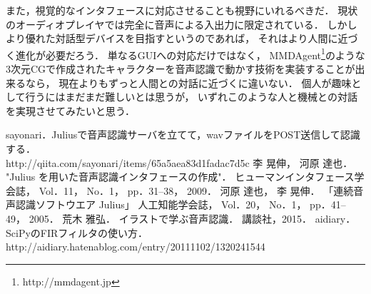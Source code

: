 \documentclass{jsarticle}
\begin{document}
\begin{multicols}{2}
また，視覚的なインタフェースに対応させることも視野にいれるべきだ．
現状のオーディオプレイヤでは完全に音声による入出力に限定されている．
しかしより優れた対話型デバイスを目指すというのであれば，
それはより人間に近づく進化が必要だろう．
単なるGUIへの対応だけではなく，
MMDAgent\footnote{http://mmdagent.jp}のような3次元CGで作成されたキャラクターを音声認識で動かす技術を実装することが出来るなら，
現在よりもずっと人間との対話に近づくに違いない．
個人が趣味として行うにはまだまだ難しいとは思うが，
いずれこのような人と機械との対話を実現させてみたいと思う．

\begin{thebibliography}{9}
	sayonari．Juliusで音声認識サーバを立てて，wavファイルをPOST送信して認識する．\\
	http://qiita.com/sayonari/items/65a5aea83d1fadac7d5c
	李 晃伸， 河原 達也．
	"Julius を用いた音声認識インタフェースの作成"．
	ヒューマンインタフェース学会誌， Vol．11， No．1， pp．31--38， 2009．
	河原 達也， 李 晃伸．
	「連続音声認識ソフトウエア Julius」
	人工知能学会誌， Vol．20， No．1， pp．41--49， 2005．
	荒木 雅弘．
	イラストで学ぶ音声認識．
	講談社，2015．
	aidiary．
	SciPyのFIRフィルタの使い方． \\
	http://aidiary.hatenablog.com/entry/20111102/1320241544
\end{thebibliography}


\end{multicols}
\end{document}
